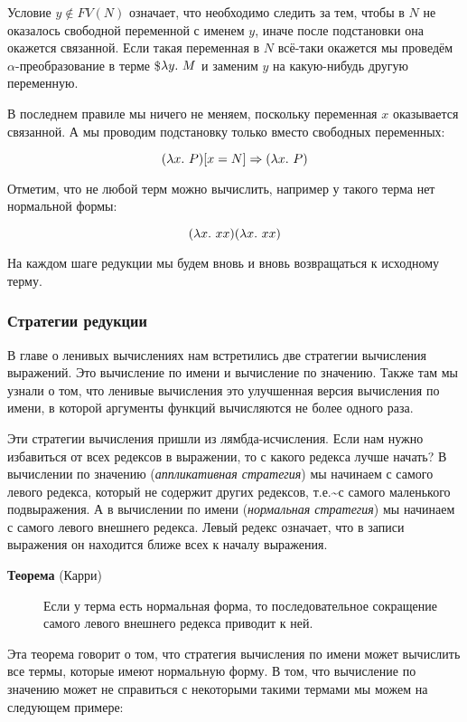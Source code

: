 Условие $y \notin FV(N)$ означает, что необходимо следить за тем, чтобы
в $N$ не оказалось свободной переменной с именем $y$, иначе после
подстановки она окажется связанной. Если такая переменная в $N$ всё-таки
окажется мы проведём $\alpha$-преобразование в терме \$$\lambda y .\  M$
и заменим $y$ на какую-нибудь другую переменную.

В последнем правиле мы ничего не меняем, поскольку переменная $x$
оказывается связанной. А мы проводим подстановку только вместо свободных
переменных:

\[(\lambda x .\  P)[x = N] \Rightarrow (\lambda x .\  P)\]

Отметим, что не любой терм можно вычислить, например у такого терма нет
нормальной формы:

\[(\lambda x .\  x x)(\lambda x .\  x x)\]

На каждом шаге редукции мы будем вновь и вновь возвращаться к исходному
терму.

\subsubsection{Стратегии редукции}

В главе о ленивых вычислениях нам встретились две стратегии вычисления
выражений. Это вычисление по имени и вычисление по значению. Также там
мы узнали о том, что ленивые вычисления это улучшенная версия вычисления
по имени, в которой аргументы функций вычисляются не более одного раза.

Эти стратегии вычисления пришли из лямбда-исчисления. Если нам нужно
избавиться от всех редексов в выражении, то с какого редекса лучше
начать? В вычислении по значению (\emph{аппликативная стратегия}) мы
начинаем с самого левого редекса, который не содержит других редексов,
т.е.\textasciitilde{}с самого маленького подвыражения. А в вычислении по
имени (\emph{нормальная стратегия}) мы начинаем с самого левого внешнего
редекса. Левый редекс означает, что в записи выражения он находится
ближе всех к началу выражения.

\begin{description}
\item[\textbf{Теорема} (Карри)]
Если у терма есть нормальная форма, то последовательное сокращение
самого левого внешнего редекса приводит к ней.
\end{description}

Эта теорема говорит о том, что стратегия вычисления по имени может
вычислить все термы, которые имеют нормальную форму. В том, что
вычисление по значению может не справиться с некоторыми такими термами
мы можем на следующем примере:


